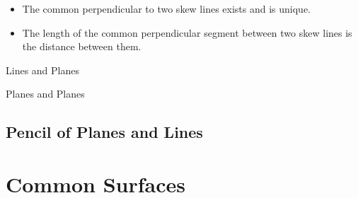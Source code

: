 \documentclass[11pt]{../../TexTemplate/elegantbook} %
\begin{document}
\begin{property}
    \begin{itemize}
        \item The common perpendicular to two skew lines exists and is unique.
        \item The length of the common perpendicular segment between two skew lines is the distance between them.
    \end{itemize}
\end{property}


\begin{leftbarTitle}{Lines and Planes}\end{leftbarTitle}

\begin{leftbarTitle}{Planes and Planes}\end{leftbarTitle}


\section{Pencil of Planes and Lines}

\chapter{Common Surfaces}
\end{document}
